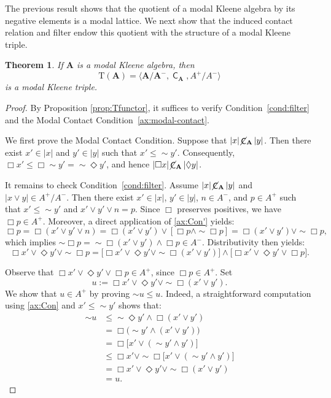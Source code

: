 \documentclass{article}
\newtheorem{theorem}{Theorem}[section]
\DeclareMathOperator{\con}{\mathsf{C}}
\DeclareMathOperator{\notcon}{\cancel{ \con}}
\newcommand{\A}{\mathbf{A}}
\begin{document}
The previous result shows that the quotient of a modal Kleene algebra by its negative elements is a modal lattice. We next show that the induced contact relation and filter endow this quotient with the structure of a modal Kleene triple.

\begin{theorem}
\label{thm:cociente-modal}
    If $\A$ is a modal Kleene algebra, then 
    \[
        \mathrm{T}(\A)=\langle \A/\A^{-}, \con_{\A},A^{+}  / A^{-} \rangle
    \]
    is a modal Kleene triple. 
\end{theorem}
\begin{proof}
    By Proposition \ref{prop:Tfunctor}, it suffices to verify Condition~\eqref{cond:filter} and the Modal Contact Condition~\eqref{ax:modal-contact}.

    We first prove the Modal Contact Condition. Suppose that $|x| \notcon_\A |y|$. Then there exist $x' \in |x|$ and $y' \in |y|$ such that $x' \leq \sim y'$. Consequently, $\Box x' \leq \Box \sim y' = \sim \Diamond y'$, and hence $|\Box x| \notcon_\A |\Diamond y|$.

    It remains to check Condition~\eqref{cond:filter}. Assume $|x| \notcon_\A |y|$ and $|x\vee y| \in A^{+}/A^{-}$. Then there exist $x' \in |x|$, $y' \in |y|$, $n \in A^{-}$, and $p \in A^{+}$ such that $x' \leq \sim y'$ and $x' \vee y' \vee n = p$. Since $\Box$ preserves positives, we have $\Box p \in A^{+}$. Moreover, a direct application of \eqref{ax:Con'} yields:
    \[
        \Box p = \Box(x'\vee y'\vee n) = \Box(x'\vee y') \vee [\Box p \wedge \sim \Box p] = \Box(x'\vee y') \vee \sim \Box p,
    \]
    which implies $\sim \Box p = \sim \Box(x'\vee y') \wedge \Box p \in A^{-}$. Distributivity then yields:
    \begin{equation*}
        \Box x' \vee \Diamond y' \vee \sim \Box p = \bigl[\Box x' \vee \Diamond y' \vee \sim \Box(x'\vee y')\bigr] \wedge \bigl[\Box x' \vee \Diamond y' \vee \Box p\bigr].
    \end{equation*}

    Observe that $\Box x' \vee \Diamond y' \vee \Box p \in A^{+}$, since $\Box p \in A^{+}$. Set 
    \[
        u := \Box x' \vee \Diamond y' \vee \sim \Box(x'\vee y').
    \]
    We show that $u \in A^{+}$ by proving $\sim u \leq u$. Indeed, a straightforward computation using \eqref{ax:Con} and $x'\leq \sim y'$ shows that:
    \begin{align*}
        \sim u &\leq \sim \Diamond y' \wedge \Box(x'\vee y') \\
        &= \Box\bigl(\sim y' \wedge (x'\vee y')\bigr) \\
        &= \Box\bigl[x' \vee (\sim y' \wedge y')\bigr] \\
        &\leq \Box x' \vee \sim \Box\bigl[x' \vee (\sim y' \wedge y')\bigr] \\
        &= \Box x' \vee \Diamond y' \vee \sim \Box(x'\vee y') \\
        &= u.
    \end{align*}


\end{proof}
\end{document}
